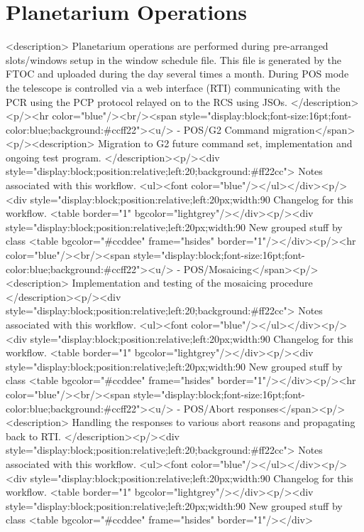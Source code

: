     \section{Planetarium Operations}

    <description>
      Planetarium operations are performed during pre-arranged slots/windows setup in the window schedule file.
      This file is generated by the FTOC and uploaded during the day several times a month. During POS mode
      the telescope is controlled via a web interface (RTI) communicating with the PCR using the PCP protocol 
      relayed on to the RCS using JSOs.
    </description><p/><hr color="blue"/><br/><span style="display:block;font-size:16pt;font-color:blue;background:#ccff22"><u/> -    POS/G2 Command migration</span><p/><description>
	Migration to G2 future command set, implementation and ongoing test program.
      </description><p/><div style="display:block;position:relative;left:20;background:#ff22cc">
      Notes associated with this workflow.
      <ul><font color="blue"/></ul></div><p/><div style="display:block;position:relative;left:20px;width:90%
      Changelog for this workflow.
      <table border="1" bgcolor="lightgrey"/></div><p/><div style="display:block;position:relative;left:20px;width:90%
     New grouped stuff by class
     <table bgcolor="#ccddee" frame="hsides" border="1"/></div><p/><hr color="blue"/><br/><span style="display:block;font-size:16pt;font-color:blue;background:#ccff22"><u/> -    POS/Mosaicing</span><p/><description>
	Implementation and testing of the mosaicing procedure
      </description><p/><div style="display:block;position:relative;left:20;background:#ff22cc">
      Notes associated with this workflow.
      <ul><font color="blue"/></ul></div><p/><div style="display:block;position:relative;left:20px;width:90%
      Changelog for this workflow.
      <table border="1" bgcolor="lightgrey"/></div><p/><div style="display:block;position:relative;left:20px;width:90%
     New grouped stuff by class
     <table bgcolor="#ccddee" frame="hsides" border="1"/></div><p/><hr color="blue"/><br/><span style="display:block;font-size:16pt;font-color:blue;background:#ccff22"><u/> -    POS/Abort responses</span><p/><description>
	Handling the responses to various abort reasons and propagating back to RTI.
      </description><p/><div style="display:block;position:relative;left:20;background:#ff22cc">
      Notes associated with this workflow.
      <ul><font color="blue"/></ul></div><p/><div style="display:block;position:relative;left:20px;width:90%
      Changelog for this workflow.
      <table border="1" bgcolor="lightgrey"/></div><p/><div style="display:block;position:relative;left:20px;width:90%
     New grouped stuff by class
     <table bgcolor="#ccddee" frame="hsides" border="1"/></div>

